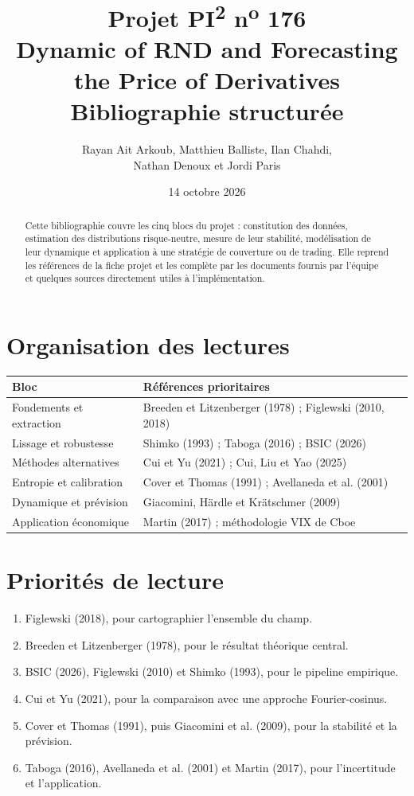 \documentclass[11pt,a4paper]{article}
\title{\textcolor{esilvblue}{Projet PI\textsuperscript{2} n\textsuperscript{o} 176}\\
\Large Dynamic of RND and Forecasting the Price of Derivatives\\[0.4em]
\large Bibliographie structurée}
\author{Rayan Ait Arkoub, Matthieu Balliste, Ilan Chahdi,\\
Nathan Denoux et Jordi Paris}
\date{14 octobre 2026}
\begin{document}
\maketitle

\begin{abstract}
Cette bibliographie couvre les cinq blocs du projet : constitution des données,
estimation des distributions risque-neutre, mesure de leur stabilité, modélisation
de leur dynamique et application à une stratégie de couverture ou de trading.
Elle reprend les références de la fiche projet et les complète par les documents
fournis par l'équipe et quelques sources directement utiles à l'implémentation.
\end{abstract}

\section*{Organisation des lectures}

\begin{tabularx}{\textwidth}{@{}p{}X@{}}
\toprule
\textbf{Bloc} & \textbf{Références prioritaires} \\
\midrule
Fondements et extraction & Breeden et Litzenberger (1978) ; Figlewski (2010, 2018) \\
Lissage et robustesse & Shimko (1993) ; Taboga (2016) ; BSIC (2026) \\
Méthodes alternatives & Cui et Yu (2021) ; Cui, Liu et Yao (2025) \\
Entropie et calibration & Cover et Thomas (1991) ; Avellaneda et al. (2001) \\
Dynamique et prévision & Giacomini, Härdle et Krätschmer (2009) \\
Application économique & Martin (2017) ; méthodologie VIX de Cboe \\
\bottomrule
\end{tabularx}

\section*{Priorités de lecture}

\begin{enumerate}
  \item Figlewski (2018), pour cartographier l'ensemble du champ.
  \item Breeden et Litzenberger (1978), pour le résultat théorique central.
  \item BSIC (2026), Figlewski (2010) et Shimko (1993), pour le pipeline empirique.
  \item Cui et Yu (2021), pour la comparaison avec une approche Fourier-cosinus.
  \item Cover et Thomas (1991), puis Giacomini et al. (2009), pour la stabilité et la prévision.
  \item Taboga (2016), Avellaneda et al. (2001) et Martin (2017), pour l'incertitude et l'application.
\end{enumerate}
\end{document}
